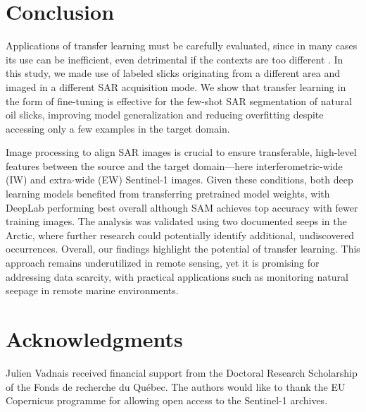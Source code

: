 \documentclass[journal]{IEEEtran}
\begin{document}
\section{Conclusion}
Applications of transfer learning must be carefully evaluated, since in many cases its use can be inefficient, even detrimental if the contexts are too different \cite{mensinkFactorsInfluenceTransfer2022}.
In this study, we made use of labeled slicks originating from a different area and imaged in a different SAR acquisition mode. 
We show that transfer learning in the form of fine-tuning is effective for the few-shot SAR segmentation of natural oil slicks, improving model generalization and reducing overfitting 
despite accessing only a few examples in the target domain.

Image processing to align SAR images is crucial to ensure transferable, high-level features between the source and the target domain—here interferometric-wide (IW) and extra-wide (EW) Sentinel-1 images.
Given these conditions, both deep learning models benefited from transferring pretrained model weights, with DeepLab performing best overall although SAM achieves top accuracy with fewer training images.
The analysis was validated using two documented seeps in the Arctic, where further research could potentially identify additional, undiscovered occurrences. 
Overall, our findings highlight the potential of transfer learning. This approach remains underutilized in remote sensing, yet it is promising for addressing data scarcity, 
with practical applications such as monitoring natural seepage in remote marine environments. 

\section*{Acknowledgments}
Julien Vadnais received financial support from the Doctoral Research Scholarship of the Fonds de recherche du Québec. 
The authors would like to thank the EU Copernicus programme for allowing open access to the Sentinel-1 archives.


\end{document}
